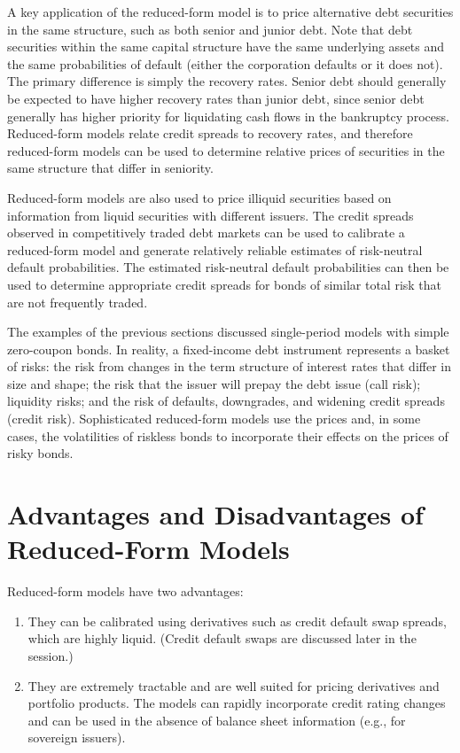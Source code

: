 \documentclass[11pt]{article}
\begin{document}
A key application of the reduced-form model is to price alternative debt securities in the same structure, such as both senior and junior debt. Note that debt securities within the same capital structure have the same underlying assets and the same probabilities of default (either the corporation defaults or it does not). The primary difference is simply the recovery rates. Senior debt should generally be expected to have higher recovery rates than junior debt, since senior debt generally has higher priority for liquidating cash flows in the bankruptcy process. Reduced-form models relate credit spreads to recovery rates, and therefore reduced-form models can be used to determine relative prices of securities in the same structure that differ in seniority.

Reduced-form models are also used to price illiquid securities based on information from liquid securities with different issuers. The credit spreads observed in competitively traded debt markets can be used to calibrate a reduced-form model and generate relatively reliable estimates of risk-neutral default probabilities. The estimated risk-neutral default probabilities can then be used to determine appropriate credit spreads for bonds of similar total risk that are not frequently traded.

The examples of the previous sections discussed single-period models with simple zero-coupon bonds. In reality, a fixed-income debt instrument represents a basket of risks: the risk from changes in the term structure of interest rates that differ in size and shape; the risk that the issuer will prepay the debt issue (call risk); liquidity risks; and the risk of defaults, downgrades, and widening credit spreads (credit risk). Sophisticated reduced-form models use the prices and, in some cases, the volatilities of riskless bonds to incorporate their effects on the prices of risky bonds.

\section*{Advantages and Disadvantages of Reduced-Form Models}
Reduced-form models have two advantages:

\begin{enumerate}
  \item They can be calibrated using derivatives such as credit default swap spreads, which are highly liquid. (Credit default swaps are discussed later in the session.)

  \item They are extremely tractable and are well suited for pricing derivatives and portfolio products. The models can rapidly incorporate credit rating changes and can be used in the absence of balance sheet information (e.g., for sovereign issuers).

\end{enumerate}
\end{document}
